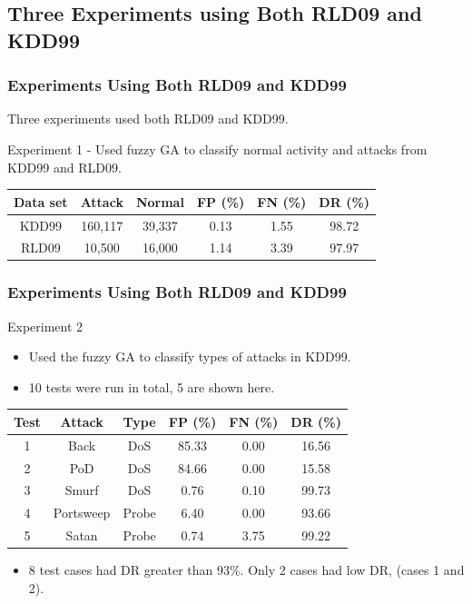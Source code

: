 \documentclass{beamer}
\newcommand{\linespace}{\vskip 0.25cm}
\begin{document}
\subsection{Three Experiments using Both RLD09 and KDD99}
\begin{frame}
	\frametitle{Experiments Using Both RLD09 and KDD99}
Three experiments used both RLD09 and KDD99.

\linespace
\linespace

Experiment 1 - Used fuzzy GA to classify normal activity and attacks from KDD99 and RLD09.
	
\begin{table}
\begin{tabular}{cccccc}
Data set & Attack & Normal & FP (\%) & FN (\%) & DR (\%)\\ \hline
KDD99 & 160,117 & 39,337 & 0.13 & 1.55 & 98.72\\
RLD09 & 10,500 & 16,000 & 1.14 & 3.39 & 97.97\\
\end{tabular}
\end{table}
\end{frame}


\begin{frame}
	\frametitle{Experiments Using Both RLD09 and KDD99}
Experiment 2
	\begin{itemize}
		\item Used the fuzzy GA to classify types of attacks in KDD99.
		\item 10 tests were run in total, 5 are shown here.
	\end{itemize}
\begin{table}
\begin{tabular}{cccccc}
Test & Attack & Type & FP (\%) & FN (\%) & DR (\%)\\ \hline
1 & Back & DoS & 85.33 & 0.00 & 16.56\\
2 & PoD & DoS & 84.66 & 0.00 & 15.58\\
3 & Smurf & DoS & 0.76 & 0.10 & 99.73\\
4 & Portsweep & Probe & 6.40 & 0.00 & 93.66\\
5 & Satan & Probe & 0.74 & 3.75 & 99.22\\
\end{tabular}
\end{table}

\begin{itemize}
	\item 8 test cases had DR greater than 93\%. Only 2 cases had low DR, (cases 1 and 2).
\end{itemize}

\end{frame}
\end{document}

